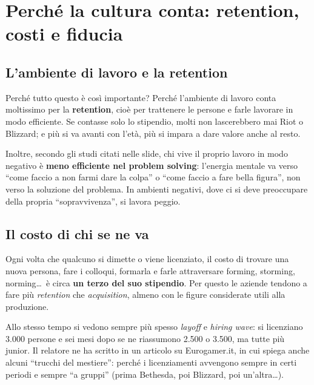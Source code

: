 \section{Perché la cultura conta: retention, costi e fiducia}
\label{sec:z1-cultura}

\subsection{L'ambiente di lavoro e la retention}

Perché tutto questo è così importante? Perché l'ambiente di lavoro conta
moltissimo per la \textbf{retention}, cioè per trattenere le persone e farle
lavorare in modo efficiente. Se contasse solo lo stipendio, molti non
lascerebbero mai Riot o Blizzard; e più si va avanti con l'età, più si impara
a dare valore anche al resto.

Inoltre, secondo gli studi citati nelle slide, chi vive il proprio lavoro in
modo negativo è \textbf{meno efficiente nel problem solving}: l'energia
mentale va verso ``come faccio a non farmi dare la colpa'' o ``come faccio a
fare bella figura'', non verso la soluzione del problema. In ambienti negativi,
dove ci si deve preoccupare della propria ``sopravvivenza'', si lavora
peggio.

\subsection{Il costo di chi se ne va}

Ogni volta che qualcuno si dimette o viene licenziato, il costo di trovare
una nuova persona, fare i colloqui, formarla e farle attraversare forming,
storming, norming\dots\ è circa \textbf{un terzo del suo stipendio}. Per questo
le aziende tendono a fare più \emph{retention} che \emph{acquisition}, almeno
con le figure considerate utili alla produzione.

Allo stesso tempo si vedono sempre più spesso \emph{layoff} e \emph{hiring
wave}: si licenziano 3.000 persone e sei mesi dopo se ne riassumono 2.500 o
3.500, ma tutte più junior. Il relatore ne ha scritto in un articolo su
Eurogamer.it, in cui spiega anche alcuni ``trucchi del mestiere'': perché i
licenziamenti avvengono sempre in certi periodi e sempre ``a gruppi'' (prima
Bethesda, poi Blizzard, poi un'altra\dots).

